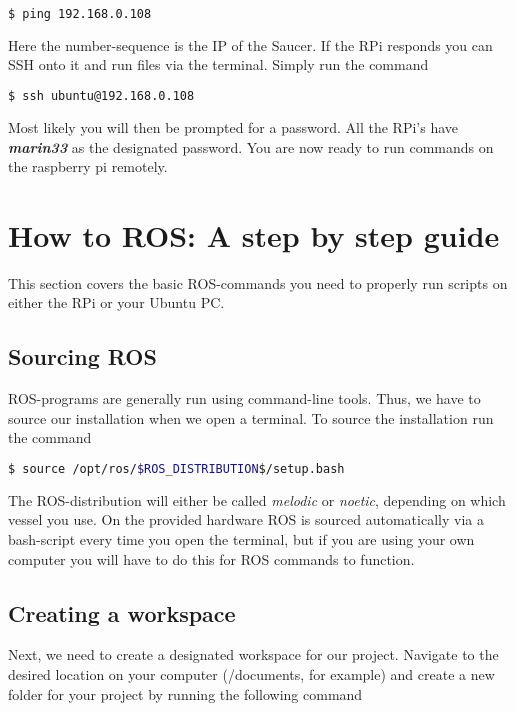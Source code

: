 \begin{lstlisting}[language=bash]
$ ping 192.168.0.108
\end{lstlisting}

Here the number-sequence is the IP of the Saucer. If  the RPi responds you can SSH onto it and run files via the terminal. Simply run the command

\begin{lstlisting}[language=bash]
$ ssh ubuntu@192.168.0.108
\end{lstlisting}

Most likely you will then be prompted for a password. All the RPi's have \textbf{\textit{marin33}} as the designated password. You are now ready to run commands on the raspberry pi remotely. 

\section{How to ROS: A step by step guide}

This section covers the basic ROS-commands you need to properly run scripts on either the RPi or your Ubuntu PC. 

\subsection{Sourcing ROS}

ROS-programs are generally run using command-line tools. Thus, we have to source our installation when we open a terminal. To source the installation run the command
\begin{lstlisting}[language=bash]
$ source /opt/ros/$ROS_DISTRIBUTION$/setup.bash
\end{lstlisting}

The ROS-distribution will either be called \textit{melodic} or \textit{noetic}, depending on which vessel you use. On the provided hardware ROS is sourced automatically via a bash-script every time you open the terminal, but if you are using your own computer you will have to do this for ROS commands to function.

\subsection{Creating a workspace}

Next, we need to create a designated workspace for our project. Navigate to the desired location on your computer (/documents, for example) and create a new folder for your project by running the following command

